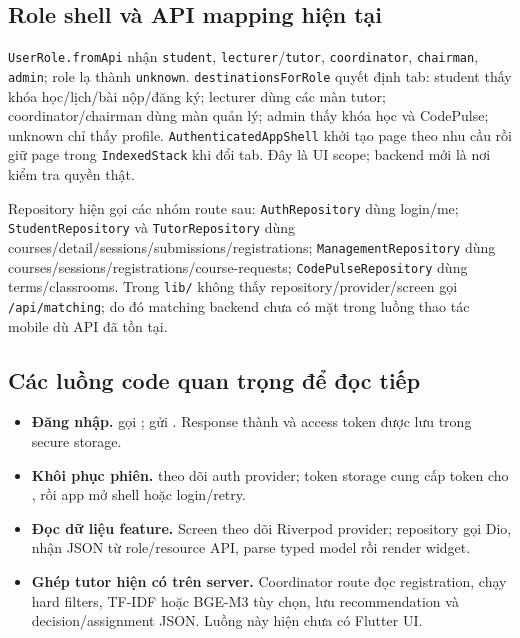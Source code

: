 \documentclass[11pt,a4paper]{article}
\begin{document}
\subsection{Role shell và API mapping hiện tại}
\texttt{UserRole.fromApi} nhận \texttt{student}, \texttt{lecturer}/\texttt{tutor}, \texttt{coordinator}, \texttt{chairman}, \texttt{admin}; role lạ thành \texttt{unknown}. \texttt{destinationsForRole} quyết định tab: student thấy khóa học/lịch/bài nộp/đăng ký; lecturer dùng các màn tutor; coordinator/chairman dùng màn quản lý; admin thấy khóa học và CodePulse; unknown chỉ thấy profile. \texttt{AuthenticatedAppShell} khởi tạo page theo nhu cầu rồi giữ page trong \texttt{IndexedStack} khi đổi tab. Đây là UI scope; backend mới là nơi kiểm tra quyền thật.

Repository hiện gọi các nhóm route sau: \texttt{AuthRepository} dùng login/me; \texttt{StudentRepository} và \texttt{TutorRepository} dùng courses/detail/sessions/submissions/registrations; \texttt{ManagementRepository} dùng courses/sessions/registrations/course-requests; \texttt{CodePulseRepository} dùng terms/classrooms. Trong \texttt{lib/} không thấy repository/provider/screen gọi \texttt{/api/matching}; do đó matching backend chưa có mặt trong luồng thao tác mobile dù API đã tồn tại.

\subsection{Các luồng code quan trọng để đọc tiếp}
\begin{itemize}
  \item \textbf{Đăng nhập.}  gọi ;  gửi . Response thành  và access token được lưu trong secure storage.
  \item \textbf{Khôi phục phiên.}  theo dõi auth provider; token storage cung cấp token cho , rồi app mở shell hoặc login/retry.
  \item \textbf{Đọc dữ liệu feature.} Screen theo dõi Riverpod provider; repository gọi Dio, nhận JSON từ role/resource API, parse typed model rồi render widget.
  \item \textbf{Ghép tutor hiện có trên server.} Coordinator route đọc registration, chạy hard filters, TF-IDF hoặc BGE-M3 tùy chọn, lưu recommendation và decision/assignment JSON. Luồng này hiện chưa có Flutter UI.
\end{itemize}
\end{document}
